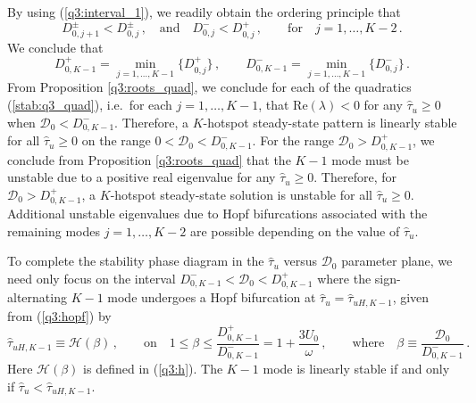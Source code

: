 \documentclass{article}%
\begin{document}
By using (\ref{q3:interval_1}), we readily obtain the ordering principle that
\begin{equation}\label{q3:d_order}
    D^{\pm}_{0,j+1} < D^{\pm}_{0,j} \,, \quad \mbox{and} \quad
    D^{-}_{0,j} < D^{+}_{0,j} \,, \qquad \mbox{for} \quad j=1,\ldots,K-2 \,.
\end{equation}
We conclude that 
\begin{equation}\label{q3:d_order_1}
    D^{+}_{0,K-1} = \min_{j=1,\ldots,K-1} \lbrace{ D^{+}_{0,j} \rbrace} \,,
    \qquad 
    D^{-}_{0,K-1} = \min_{j=1,\ldots,K-1} \lbrace{ D^{-}_{0,j} \rbrace} \,.
\end{equation}
From Proposition \ref{q3:roots_quad}, we conclude for each of the
quadratics (\ref{stab:q3_quad}), i.e.~for each $j=1,\ldots,K-1$, that
$\mbox{Re}(\lambda)<0$ for any $\hat{\tau}_u\geq 0$ when ${\mathcal
  D}_0<D^{-}_{0,K-1}$. Therefore, a $K$-hotspot steady-state pattern
is linearly stable for all $\hat{\tau}_u\geq 0$ on the range
$0<{\mathcal D}_0<D^{-}_{0,K-1}$. For the range ${\mathcal
  D}_0>D^{+}_{0,K-1}$, we conclude from Proposition
\ref{q3:roots_quad} that the $K-1$ mode must be unstable due to a
positive real eigenvalue for any $\hat{\tau}_u\geq 0$.  Therefore, for
${\mathcal D}_0>D^{+}_{0,K-1}$, a $K$-hotspot steady-state solution is
unstable for all $\hat{\tau}_u\geq 0$.  Additional unstable
eigenvalues due to Hopf bifurcations associated with the remaining modes
$j=1,\ldots,K-2$ are possible depending on the value of
$\hat{\tau}_u$.

To complete the stability phase diagram in the $\hat{\tau}_u$ versus 
${\mathcal D}_0$ parameter plane, we need only focus on the interval
$D^{-}_{0,K-1}<{\mathcal D}_0<D^{+}_{0,K-1}$ where the 
sign-alternating $K-1$ mode undergoes a Hopf bifurcation at 
$\hat{\tau}_u=\hat{\tau}_{uH,K-1}$, given from (\ref{q3:hopf}) by
\begin{equation}\label{q3:hopf_K-1}
     \hat{\tau}_{uH,K-1} \equiv {\mathcal H}\left(\beta\right) \,,
     \qquad \mbox{on} \quad 1\leq \beta \leq
     \frac{D^{+}_{0,K-1}}{D^{-}_{0,K-1}} = 1+ \frac{3U_0}{\omega} \,,
     \qquad \mbox{where} \quad \beta \equiv \frac{{\mathcal
         D}_0}{D^{-}_{0,K-1}} \,.
\end{equation}
Here ${\mathcal H}(\beta)$ is defined in (\ref{q3:h}).  The $K-1$ mode
is linearly stable if and only if $\hat{\tau}_u<\hat{\tau}_{uH,K-1}$.
\end{document}
